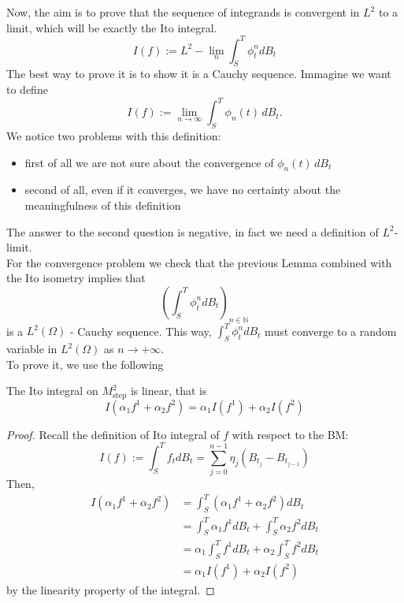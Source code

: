 Now, the aim is to prove that the sequence of integrands is convergent in $L^2$ to a limit, which will be exactly the Ito integral. 
\begin{equation*}
    I(f):= L^2-\lim_n \int_S^T \phi_t^n dB_t
\end{equation*}
The best way to prove it is to show it is a Cauchy sequence. 
Immagine we want to define 
\[
I(f) := \lim_{n \to \infty} \int_S^T \phi_n(t) \, dB_t.
\]
We notice two problems with this definition: 
\begin{itemize}
    \item first of all we are not sure about the convergence of $\phi_n(t) \, dB_t$
    \item second of all, even if it converges, we have no certainty about the meaningfulness of this definition
\end{itemize}  
The answer to the second question is negative, in fact we need a definition of $L^2$-limit.\\
For the convergence problem we check that the previous Lemma combined with the Ito isometry implies that 
\begin{equation*}
    (\int_S^T \phi_t^n dB_t)_{n \in \mathbb{N}}
\end{equation*}
is a $L^2(\Omega)$ - Cauchy sequence. This way, $\int_S^T \phi_t^ndB_t$ must converge to a random variable in $L^2(\Omega)$ as $n \rightarrow +\infty$. \\
To prove it, we use the following 
\begin{Lemma}
    The Ito integral on $M^2_{\text{step}}$ is linear, that is 
    \begin{equation}
        I(\alpha_1 f^1+\alpha_2 f^2) = \alpha_1 I(f^1) + \alpha_2I(f^2)
    \end{equation}
\end{Lemma}
\begin{ProofBox}
    \begin{proof}
    Recall the definition of Ito integral of $f$ with respect to the BM:
    \begin{equation*}
        I(f) := \int_S^T f_t dB_t = \sum_{j=0}^{n-1} \eta_j (B_{t_j} - B_{t_{j-1}})
    \end{equation*}
    Then,
    \begin{align*}
         I(\alpha_1 f^1+\alpha_2 f^2) &=  \int_S^T (\alpha_1 f^1+\alpha_2 f^2) dB_t \\
         &= \int_S^T \alpha_1f^1 dB_t + \int_S^T \alpha_2 f^2 dB_t \\
         &= \alpha_1\int_S^T f^1 dB_t + \alpha_2\int_S^T f^2 dB_t \\
         &= \alpha_1 I(f^1) + \alpha_2I(f^2)
    \end{align*}
    by the linearity property of the integral. 
\end{proof}

\end{ProofBox}
